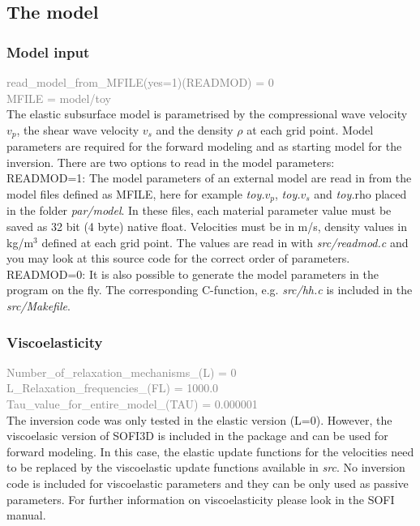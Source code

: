 \subsection{The model}
\subsubsection*{Model input}
\textcolor {Gray}{
read\_model\_from\_MFILE(yes=1)(READMOD) = 0\\
MFILE = model/toy} \vspace{0.1cm}\\
The elastic subsurface model is parametrised by the compressional wave velocity $v_p$, the shear wave velocity $v_s$ and the density $\rho$ at each grid point. Model parameters are required for the forward modeling and as starting model for the inversion. There are two options to read in the model parameters:\\
READMOD=1: The model parameters of an external model are read in from the model files defined as MFILE, here for example  \textit{toy.$v_p$}, \textit{toy.$v_s$} and \textit{toy.$\text{rho}$} placed in the folder \textit{par/model}. In these files, each material parameter value must be saved as 32 bit (4 byte) native float.
Velocities must be in m/s, density values in kg/m$^3$ defined at each grid point. The values are read in with \textit{src/readmod.c} and you may look at this source code for the correct order of parameters.\\
READMOD=0: It is also possible to generate the model parameters in the program on the fly. The corresponding C-function, e.g. \textit{src/hh.c} is included in the \textit{src/Makefile}. 
\subsubsection*{Viscoelasticity}
\textcolor {Gray}{Number\_of\_relaxation\_mechanisms\_(L) = 0\\
L\_Relaxation\_frequencies\_(FL) = 1000.0\\ 
Tau\_value\_for\_entire\_model\_(TAU) = 0.000001}\vspace{0.1cm}\\
The inversion code was only tested in the elastic version (L=0). However, the viscoelasic version of SOFI3D is included in the package and can be used for forward modeling. In this case, the elastic update functions for the velocities need to be replaced by the viscoelastic update functions available in \textit{src}. No inversion code is  included for viscoelastic parameters and they can be only used as passive parameters. For further information on viscoelasticity please look in the SOFI manual.
